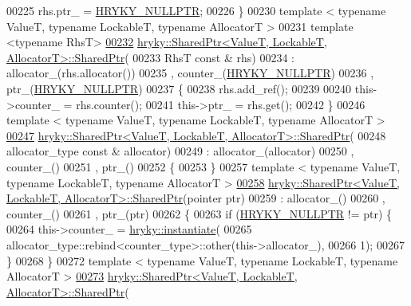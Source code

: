 \begin{DoxyCode}
00225     rhs.ptr\_ = \hyperlink{common_8h_a4cd4ac09cfcdbd6b30ee69afc156e210}{HRYKY_NULLPTR};
00226 \}
00230 \textcolor{keyword}{template} < \textcolor{keyword}{typename} ValueT, \textcolor{keyword}{typename} LockableT, \textcolor{keyword}{typename} AllocatorT >
00231 \textcolor{keyword}{template} <\textcolor{keyword}{typename} RhsT>
\hypertarget{shared__ptr_8h_source_l00232}{}\hyperlink{classhryky_1_1_shared_ptr_adc02319bdbd429f83307290b3ab4a298}{00232} \hyperlink{classhryky_1_1_shared_ptr}{hryky::SharedPtr<ValueT, LockableT, AllocatorT>::SharedPtr}(
00233     RhsT \textcolor{keyword}{const} & rhs)
00234     : allocator\_(rhs.allocator())
00235       , counter\_(\hyperlink{common_8h_a4cd4ac09cfcdbd6b30ee69afc156e210}{HRYKY_NULLPTR})
00236       , ptr\_(\hyperlink{common_8h_a4cd4ac09cfcdbd6b30ee69afc156e210}{HRYKY_NULLPTR})
00237 \{
00238     rhs.add\_ref();
00239 
00240     this->counter\_ = rhs.counter();
00241     this->ptr\_ = rhs.get();
00242 \}
00246 \textcolor{keyword}{template} < \textcolor{keyword}{typename} ValueT, \textcolor{keyword}{typename} LockableT, \textcolor{keyword}{typename} AllocatorT >
\hypertarget{shared__ptr_8h_source_l00247}{}\hyperlink{classhryky_1_1_shared_ptr_a6d3392ff4a95549180e6045797e7982c}{00247} \hyperlink{classhryky_1_1_shared_ptr}{hryky::SharedPtr<ValueT, LockableT, AllocatorT>::SharedPtr}(
00248     allocator\_type \textcolor{keyword}{const} & allocator)
00249     : allocator\_(allocator)
00250       , counter\_()
00251       , ptr\_()
00252 \{
00253 \}
00257 \textcolor{keyword}{template} < \textcolor{keyword}{typename} ValueT, \textcolor{keyword}{typename} LockableT, \textcolor{keyword}{typename} AllocatorT >
\hypertarget{shared__ptr_8h_source_l00258}{}\hyperlink{classhryky_1_1_shared_ptr_a7348d5624e30228d7f3477ae93e2cf68}{00258} \hyperlink{classhryky_1_1_shared_ptr}{hryky::SharedPtr<ValueT, LockableT, AllocatorT>::SharedPtr}(pointer ptr)
00259     : allocator\_()
00260       , counter\_()
00261       , ptr\_(ptr)
00262 \{
00263     \textcolor{keywordflow}{if} (\hyperlink{common_8h_a4cd4ac09cfcdbd6b30ee69afc156e210}{HRYKY_NULLPTR} != ptr) \{
00264         this->counter\_ = \hyperlink{classhryky_1_1_shared_ptr_a51f756b899403aa6c8a182bb5bbfd6a8}{hryky::instantiate}(
00265             allocator\_type::rebind<counter\_type>::other(this->allocator\_),
00266             1);
00267     \}
00268 \}
00272 \textcolor{keyword}{template} < \textcolor{keyword}{typename} ValueT, \textcolor{keyword}{typename} LockableT, \textcolor{keyword}{typename} AllocatorT >
\hypertarget{shared__ptr_8h_source_l00273}{}\hyperlink{classhryky_1_1_shared_ptr_aa9c65a69a23f91e48be1e7e9c0c5cf74}{00273} \hyperlink{classhryky_1_1_shared_ptr}{hryky::SharedPtr<ValueT, LockableT, AllocatorT>::SharedPtr}(

\end{DoxyCode}
